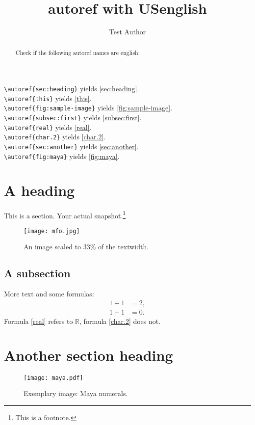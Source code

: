 \documentclass{snapshotmfo}
\author{Test Author}
\title{autoref with USenglish}
\begin{document}
\begin{abstract}
Check if the following autoref names are english:
\end{abstract}

\noindent \verb+\autoref{sec:heading}+ yields \autoref{sec:heading}.\\
\verb+\autoref{this}+ yields \autoref{this}.\\
\verb+\autoref{fig:sample-image}+ yields \autoref{fig:sample-image}.\\
\verb+\autoref{subsec:first}+ yields \autoref{subsec:first}.\\
\verb+\autoref{real}+ yields \autoref{real}.\\
\verb+\autoref{char.2}+ yields \autoref{char.2}.\\
\verb+\autoref{sec:another}+ yields \autoref{sec:another}.\\
\verb+\autoref{fig:maya}+ yields \autoref{fig:maya}.\\


\section{A heading}
\label{sec:heading}
This is a section.
Your actual snapshot.\footnote{This is a footnote.\label{this}}

\begin{figure}[ht]
        \centering 
        \texttt{[image: mfo.jpg]}
        \caption{An image scaled to 33\% of the textwidth.}
\label{fig:sample-image}
\end{figure}

\subsection{A subsection}
\label{subsec:first}
More text and some formulas:
\begin{align}\label{real}
1+1&=2,\\\label{char.2}
1+1&=0.
\end{align}
Formula \eqref{real} refers to $\mathbb{R}$, formula \eqref{char.2} does not.


\section{Another section heading}
\label{sec:another}

\begin{figure}[ht]
        \centering 
        \texttt{[image: maya.pdf]}
        \caption{Exemplary image: Maya numerals.}
\label{fig:maya}
\end{figure}
\end{document}
